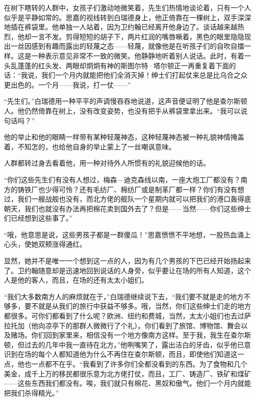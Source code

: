 \par 在树下瞎转的人群中，女孩子们激动地微笑着，先生们热情地谈论着，只有一个人似乎是平静如常的。思嘉的视线转到白瑞德身上，他正倚靠在一棵树上，双手深深地插在裤袋里。他单独一人站着，因为卫约翰已经离开他身边了。谈话越来越热烈，他却一言不发。剪得短短的胡子下，两片红润的嘴唇噘着，黑色的眼里隐隐现出一丝因感到有趣而露出的轻蔑之态——轻蔑，就像他是在听孩子们的自吹自擂一样。这是一种表示意见非常不一致的微笑。他静静地听着别人说话。此时，有着一头乱蓬蓬的红头发、两眼却炯炯有神的斯图尔特·塔尔顿正一再重复着下面的话：“我说，我们一个月内就能把他们全消灭掉！绅士们打起仗来总是比乌合之众更出色的。一个月——我说，打一仗——”
\par “先生们。”白瑞德用一种平平的声调慢吞吞地说道，这声音便证明了他是查尔斯顿人。他仍然倚靠在树上，没有改变姿势，也没有把手从裤袋里拿出来。“我可以说句话吗？”
\par 他的举止和他的眼睛一样带有某种轻蔑神态，这种轻蔑神态被一种礼貌神情掩盖着，不知怎的，也给他自身的举止蒙上了一丝嘲讽意味。
\par 人群都转过身去看着他，用一种对待外人所惯有的礼貌迎候他的话。
\par “你们这些先生们有没有人想过，梅森—迪克森线以南，一座大炮工厂都没有？南方的铸铁厂也少得可怜？还有毛纺厂、棉纺厂或是制革厂都一样？你们有没有想过，我们一艘战舰也没有，而北方佬的舰队一个星期内就可以把我们的港口轰得底朝天，我们也就没有办法再把棉花卖到国外去了？但是——当然——你们这些绅士们已经想到这些事了。”
\par “哦，他意思是说，这些男孩子都是一群傻瓜！”思嘉愤愤不平地想，一股热血涌上心头，使她双颊涨得通红。
\par 显然，她并不是唯一一个想到这一点的人，因为有几个男孩的下巴已经开始扬起来了。卫约翰随意却是迅速地回到说话的人身旁，似乎要让在场的所有人知道，这个人是他的客人，而且，在场的还有太太小姐们。
\par “我们大多数南方人的麻烦就在于，”白瑞德继续说下去，“我们要不就是走的地方不够多，要不就是从我们的旅行中获益不够多。哦，当然，你们这些绅士们走的地方都很多。可你们都看到了什么呢？欧洲、纽约和费城，当然，太太小姐们也去过萨拉托加（他向凉亭下的那群人微微行了个礼）。你们看到了旅馆、博物馆、舞会以及赌场。你们回到家里来，相信没有一个地方像南方这样。至于我，我生在查尔斯顿，但过去的几年中我一直待在北方。”他咧嘴笑了，露出洁白的牙齿，似乎他已意识到在场的每个人都知道他为什么不再住在查尔斯顿，而且，即使他们知道这一点，他也一点都不在乎。“我看到了许多你们全都没看到的东西。为了食物和几个美金，成千上万的移民都很乐意为北方佬打仗，而且，工厂、铸造厂、铁矿和煤矿——这些东西我们都没有。唉，我们就只有棉花、黑奴和傲气。他们一个月内就能把我们杀得精光。”

